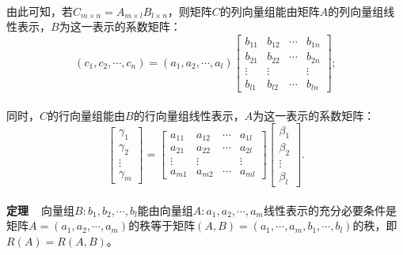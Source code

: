 \paragraph{}
由此可知，若$C_{m\times n}=A_{m\times l}B_{l\times n}$，则矩阵$C$的列向量组能由矩阵$A$的列向量组线性表示，$B$为这一表示的系数矩阵：
\begin{equation*}
  (c_1,c_2,\cdots,c_n) = (a_1,a_2,\cdots,a_l)\left[\begin{array}{cccc}
    b_{11} & b_{12} & \cdots & b_{1n} \\
    b_{21} & b_{22} & \cdots & b_{2n} \\
    \vdots & \vdots &  & \vdots \\
    b_{l1} & b_{l2} & \cdots & b_{ln}
  \end{array}\right];
\end{equation*}
\paragraph{}
同时，$C$的行向量组能由$B$的行向量组线性表示，$A$为这一表示的系数矩阵：
\begin{equation*}
  \left[\begin{array}{c}
    \gamma_1 \\
    \gamma_2 \\
    \vdots \\
    \gamma_m
  \end{array}\right] = \left[\begin{array}{cccc}
    a_{11} & a_{12} & \cdots & a_{1l} \\
    a_{21} & a_{22} & \cdots & a_{2l} \\
    \vdots & \vdots &  & \vdots \\
    a_{m1} & a_{m2} & \cdots & a_{ml}
  \end{array}\right]\left[\begin{array}{c}
    \beta_1 \\
    \beta_2 \\
    \vdots \\
    \beta_l
  \end{array}\right].
\end{equation*}

\paragraph{}
\textbf{定理~~}向量组$B:b_1,b_2,\cdots,b_l$能由向量组$A: a_1, a_2,\cdots,a_m$线性表示的充分必要条件是矩阵$A=(a_1,a_2,\cdots,a_m)$的秩等于矩阵$(A,B)=(a_1,\cdots,a_m,b_1,\cdots,b_l)$的秩，即$R(A)=R(A,B)$。

